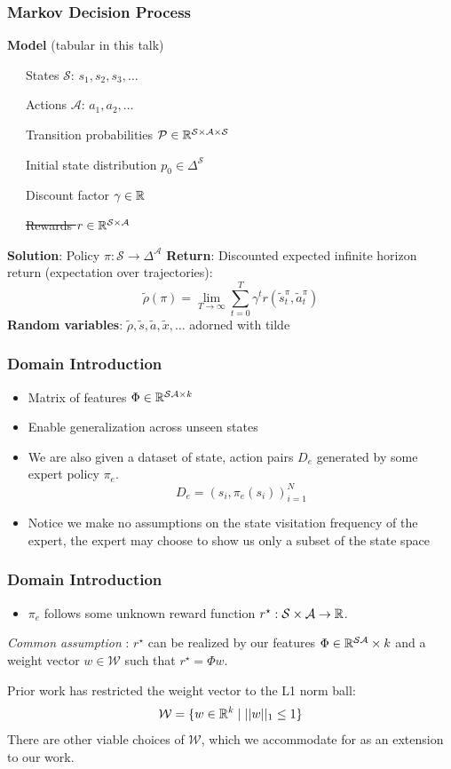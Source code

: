 \documentclass{beamer}
\begin{document}
\begin{frame} \frametitle{Markov Decision Process}
  \textbf{Model} (tabular in this talk) \par
    {\small
   ~~~States $\mathcal{S}$: $s_1, s_2, s_3, \dots $ \par
   ~~~Actions $\mathcal{A}$: $a_1, a_2, \dots $ \par
   ~~~Transition probabilities $\mathcal{P} \in \mathbb{R}^{\mathcal{S} \times \mathcal{A} \times \mathcal{S} }$ \par
   ~~~Initial state distribution $p_0 \in \Delta^\mathcal{S}$ \par
   ~~~Discount factor $\gamma \in \mathbb{R}$ \par
   ~~~\sout{Rewards $r \in \mathbb{R}^{\mathcal{S} \times \mathcal{A}}$}}
    \vfill 
    \textbf{Solution}: Policy ${\pi}\colon \mathcal{S} \to \Delta^\mathcal{A}$
    \vfill
    \textbf{Return}: Discounted expected infinite horizon return (expectation over trajectories):
    \[
	    \tilde{\rho}(\pi) = \lim_{T \to \infty} \sum_{t=0}^T \gamma^t r(\tilde{s}^{\pi}_t, \tilde{a}^{{\pi}}_t)
    \]
    \vfill
    \textbf{Random variables}: $\tilde{\rho}, \tilde{s}, \tilde{a}, \tilde{x}, \dots $ adorned with tilde
\end{frame}

\begin{frame}
	\frametitle{Domain Introduction}
	\begin{itemize}
		\item Matrix of features $\Phi \in \mathbb{R}^{\mathcal{S}\mathcal{A} \times k}$
		\item Enable generalization across unseen states
		\item We are also given a dataset of state, action pairs $D_e$ generated by some expert policy $\pi_e$. \[ D_e = (s_i, \pi_e(s_i))_{i=1}^N \]
		\item Notice we make no assumptions on the state visitation frequency of the expert,
			the expert may choose to show us only a subset of the state space
	\end{itemize}
\end{frame}

\begin{frame}
	\frametitle{Domain Introduction}
\begin{itemize}
	\item $\pi_e$ follows some unknown reward function $r^\star : \mathcal{S} \times \mathcal{A} \to \mathbb{R}$.
\end{itemize}
	\emph{Common assumption} : $r^\star$ can be realized by our features $\Phi \in \mathbb{R}^{\mathcal{S}\mathcal{A}} \times k$
	and a weight vector $w \in \mathcal{W}$ such that $r^\star = \Phi w$.

	Prior work has restricted the weight vector to the L1 norm ball:
	\[ \mathcal{W} = \lbrace w \in \mathbb{R}^k \mid \lvert \lvert w \rvert \rvert_1 \leq 1 \rbrace \]
	There are other viable choices of $\mathcal{W}$, which we accommodate for as an extension to our work.
\end{frame}
\end{document}
